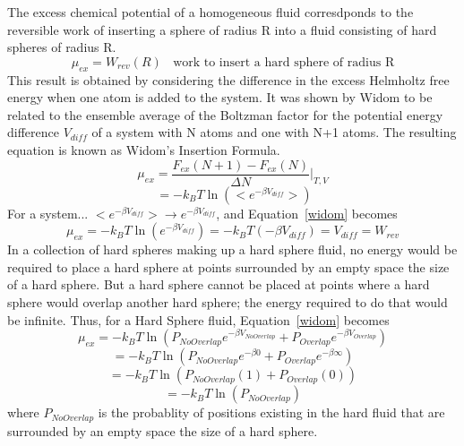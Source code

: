 \documentclass[12pt]{article}
\begin{document}
The excess chemical potential of a homogeneous fluid corresdponds to the reversible work of inserting a sphere of radius R into a fluid consisting of hard spheres of radius R. 
\begin{displaymath}\mu_{ex}=W_{rev}(R){~~~~}\text{work to insert a hard sphere of radius R}\end{displaymath}
This result is obtained by considering the difference in the excess Helmholtz free energy when one atom is added to the system. It was shown by Widom to be related to the ensemble average of the Boltzman factor for the potential energy difference $V_{diff}$ of a system with N atoms and one with N+1 atoms. The resulting equation is known as Widom's Insertion Formula.
\begin{equation}\mu_{ex}=\frac{F_{ex}(N+1)-F_{ex}(N)}{\Delta{N}}\bigg|_{T,V}\end{equation}
\begin{equation}\label{widom}{~}=-k_BT\ln\left(<e^{-\beta{V_{diff}}}>\right)\end{equation}
\color{red}For a system... $<e^{-\beta{V_{diff}}}> \rightarrow e^{-\beta{V_{diff}}}$, and Equation~\ref{widom} becomes 
\begin{equation}\mu_{ex}=-k_BT\ln\left(e^{-\beta{V_{diff}}}\right)=-k_BT(-\beta{V}_{diff})=V_{diff}=W_{rev}\end{equation}\color{black}
\indent In a collection of hard spheres making up a hard sphere fluid, no energy would be required to place a hard sphere at points surrounded by an empty space the size of a hard sphere. But a hard sphere cannot be placed at points where a hard sphere would overlap another hard sphere; the energy required to do that would be infinite. Thus, for a Hard Sphere fluid, Equation~\ref{widom} becomes
\begin{equation}\mu_{ex}=-k_BT\ln\left(P_{NoOverlap}e^{-\beta{V}_{NoOverlap}}+P_{Overlap}e^{-\beta{V}_{Overlap}}\right)\end{equation}
\begin{equation}=-k_BT\ln\left(P_{NoOverlap}e^{-\beta{0}}+P_{Overlap}e^{-\beta\infty}\right)\end{equation}
\begin{equation}=-k_BT\ln\left(P_{NoOverlap}(1)+P_{Overlap}(0)\right)\end{equation}
\begin{equation}=-k_BT\ln\left(P_{NoOverlap}\right)\end{equation}
where $P_{NoOverlap}$ is the probablity of positions existing in the hard fluid that are surrounded by an empty space the size of a hard sphere.
\end{document}
